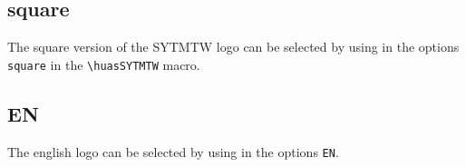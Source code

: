 \documentclass{ltxdoc}
\begin{document}
\begin{figure}[H]
        \colorbox{white}{\parbox[c][0.1\textwidth][c]{\textwidth}{
        \centering
        \huasSYTMTW}}    
        \caption*{\cmd{\huasSYTMTW}}
\end{figure}
\begin{figure}[H]
        \colorbox{huasorange}{\parbox[c][0.1\textwidth][c]{\textwidth}{
        \centering
        \huasSYTMTW[SMcolor = white]}}    
        \caption*{\cmd{\huasSYTMTW[SMcolor = white]}}
\end{figure}
\begin{figure}[H]
        \colorbox{black}{\parbox[c][0.1\textwidth][c]{\textwidth}{
        \centering
        \huasSYTMTW[YTTWcolor = white]}}    
        \caption*{\cmd{\huasSYTMTW[YTTWcolor = white]}}
\end{figure}
\subsection{square}
The square version of the SYTMTW logo can be selected by using in the options \verb|square| in the \verb|\huasSYTMTW| macro.
\begin{figure}[H]
    \begin{subfigure}[b]{0.45\textwidth}
        \colorbox{white}{\parbox[c][0.3\textwidth][c]{\textwidth}{
        \centering
        \huasSYTMTW[square, scale = 0.5]}}    
        \caption*{\cmd{\huasSYTMTW[square,   \\ scale = 0.5]}}
    \end{subfigure}
    \begin{subfigure}[b]{0.45\textwidth}
        \colorbox{huasorange}{\parbox[c][0.3\textwidth][c]{\textwidth}{
        \centering
        \huasSYTMTW[SMcolor = white, square,scale = 0.5]}}    
        \caption*{\cmd{\huasSYTMTW[SMcolor = white, square, scale = 0.5]}}
    \end{subfigure}
\end{figure}

\subsection{EN}
The english logo can be selected by using in the options \verb|EN|.
\begin{figure}[h]
    \centering
    \huaslogo[scale = 1.5, EN]
    \caption{\cmd{\huaslogo[scale = 1.5, EN]}}
\end{figure}
\begin{figure}[h]
    \centering
    \begin{subfigure}[b]{0.45\textwidth}
    \colorbox{huasorange}{\parbox[c][0.3\textwidth][c]{\textwidth}{%
        \centering 
        \huaslogo[EN, logocolor = white, scale = 1.2]}}    
        \caption*{\cmd{\huaslogo[EN, logocolor = white, scale = 1.2]}}
    \end{subfigure}
    \begin{subfigure}[b]{0.45\textwidth}
    \colorbox{black}{\parbox[c][0.3\textwidth][c]{\textwidth}{%
        \centering 
        \huaslogo[EN, textcolor = white,  scale = 1.2]}}    
        \caption*{\cmd{\huaslogo[EN, textcolor = white, scale = 1.2]}}
    \end{subfigure}
\end{figure}
\end{document}
